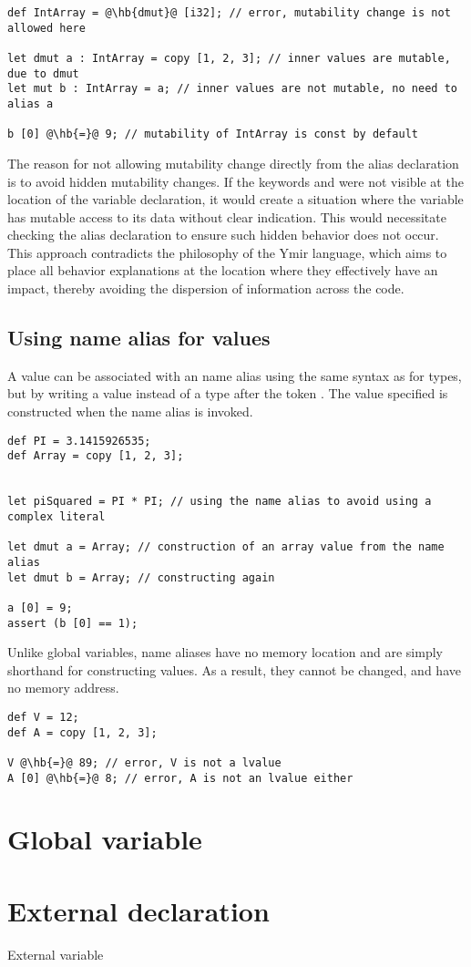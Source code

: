 \begin{lstlisting}[style=coloredverbatim, escapechar=@]
def IntArray = @\hb{dmut}@ [i32]; // error, mutability change is not allowed here

let dmut a : IntArray = copy [1, 2, 3]; // inner values are mutable, due to dmut
let mut b : IntArray = a; // inner values are not mutable, no need to alias a

b [0] @\hb{=}@ 9; // mutability of IntArray is const by default
\end{lstlisting}

The reason for not allowing mutability change directly from the alias
declaration is to avoid hidden mutability changes. If the keywords 
and  were not visible at the location of the variable declaration,
it would create a situation where the variable has mutable access to its data
without clear indication. This would necessitate checking the alias declaration
to ensure such hidden behavior does not occur. This approach contradicts the
philosophy of the Ymir language, which aims to place all behavior explanations
at the location where they effectively have an impact, thereby avoiding the
dispersion of information across the code.

\subsection{Using name alias for values}

A value can be associated with an name alias using the same syntax as for types,
but by writing a value instead of a type after the token \token{=}. The value
specified is constructed when the name alias is invoked.

\begin{lstlisting}[style=coloredverbatim]
def PI = 3.1415926535;
def Array = copy [1, 2, 3];


let piSquared = PI * PI; // using the name alias to avoid using a complex literal

let dmut a = Array; // construction of an array value from the name alias
let dmut b = Array; // constructing again

a [0] = 9;
assert (b [0] == 1);
\end{lstlisting}

Unlike global variables, name aliases have no memory location and are simply
shorthand for constructing values. As a result, they cannot be changed, and have
no memory address.

\begin{lstlisting}[style=coloredverbatim, escapechar=@]
def V = 12;
def A = copy [1, 2, 3];

V @\hb{=}@ 89; // error, V is not a lvalue
A [0] @\hb{=}@ 8; // error, A is not an lvalue either
\end{lstlisting}

\section{Global variable}%
\label{sec:global_variables}

\section{External declaration}%
\label{sec:extern_var}

External variable
